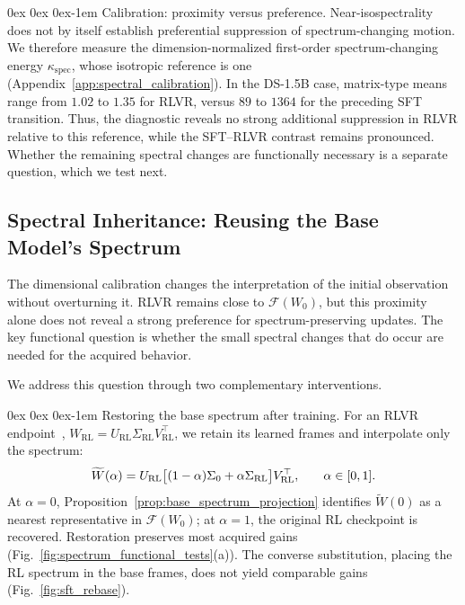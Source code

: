 \documentclass[11pt, a4paper]{utda}
\makeatletter
\renewcommand{\paragraph}{%
  \@startsection{paragraph}{4}%
  {\z@}{0ex \@plus 0ex \@minus 0ex}{-1em}%
  {\normalfont\normalsize\bfseries}%
}
\theoremstyle{plain}
\theoremstyle{definition}
\theoremstyle{remark}
\makeatother
\begin{document}
\paragraph{Calibration: proximity versus preference.}
Near-isospectrality does not by itself establish preferential
suppression of spectrum-changing motion.
We therefore measure the dimension-normalized first-order
spectrum-changing energy $\kappa_{\mathrm{spec}}$, whose isotropic
reference is one
(Appendix~\ref{app:spectral_calibration}).
In the DS-1.5B case, matrix-type means range from $1.02$ to $1.35$
for RLVR, versus $89$ to $1364$ for the preceding SFT transition.
Thus, the diagnostic reveals no strong additional suppression in
RLVR relative to this reference, while the SFT--RLVR contrast
remains pronounced.
Whether the remaining spectral changes are functionally
necessary is a separate question, which we test next.

\subsection{Spectral Inheritance: Reusing the Base Model's Spectrum}
\label{sec:spectral_inheritance_tests}

The dimensional calibration changes the interpretation of the initial
observation without overturning it. RLVR remains close to
$\mathcal F(W_0)$, but this proximity alone does not reveal a strong preference
for spectrum-preserving updates. The key functional question is whether the
small spectral changes that do occur are needed for the acquired behavior.

We address this question through two complementary interventions.

\paragraph{Restoring the base spectrum after training.}
For an RLVR endpoint~\cite{liu2025prorl},
$W_{\mathrm{RL}}
=U_{\mathrm{RL}}\Sigma_{\mathrm{RL}}V_{\mathrm{RL}}^\top$,
we retain its learned frames and interpolate only the spectrum:
\begin{equation}
\small
\label{eq:spectrum_interpolation}
\widetilde W(\alpha)
=U_{\mathrm{RL}}
 \bigl[(1-\alpha)\Sigma_0+\alpha\Sigma_{\mathrm{RL}}\bigr]
 V_{\mathrm{RL}}^\top,
\qquad \alpha\in[0,1].
\end{equation}
At $\alpha=0$, Proposition~\ref{prop:base_spectrum_projection}
identifies $\widetilde W(0)$ as a nearest representative in
$\mathcal F(W_0)$; at $\alpha=1$, the original RL checkpoint
is recovered.
Restoration preserves most acquired gains
(Fig.~\ref{fig:spectrum_functional_tests}(a)).
The converse substitution, placing the RL spectrum in the base
frames, does not yield comparable gains
(Fig.~\ref{fig:sft_rebase}).
\end{document}
